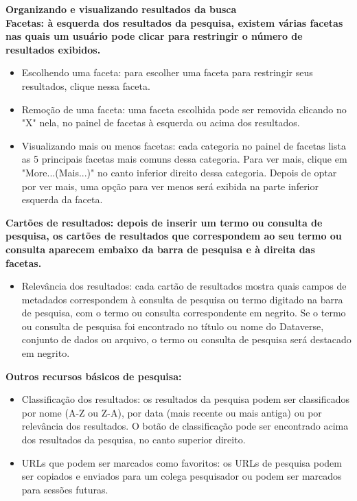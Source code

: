 \documentclass[12pt,hidelinks]{article}
\begin{document}
	    
 \textbf{Organizando e visualizando resultados da busca}\\
	        
	        
\textbf {Facetas: à esquerda dos resultados da pesquisa, existem várias facetas nas quais um usuário pode clicar para restringir o número de resultados exibidos.}

\begin{itemize}
\item Escolhendo uma faceta: para escolher uma faceta para restringir seus resultados, clique nessa faceta.
\item Remoção de uma faceta: uma faceta escolhida pode ser removida clicando no "X" nela, no painel de facetas à esquerda ou acima dos resultados.
\item Visualizando mais ou menos facetas: cada categoria no painel de facetas lista as 5 principais facetas mais comuns dessa categoria. Para ver mais, clique em "More...(Mais...)" no canto inferior direito dessa categoria. Depois de optar por ver mais, uma opção para ver menos será exibida na parte inferior esquerda da faceta.
\end{itemize}

\textbf{Cartões de resultados: depois de inserir um termo ou consulta de pesquisa, os cartões de resultados que correspondem ao seu termo ou consulta aparecem embaixo da barra de pesquisa e à direita das facetas.}

\begin{itemize}
\item Relevância dos resultados: cada cartão de resultados mostra quais campos de metadados correspondem à consulta de pesquisa ou termo digitado na barra de pesquisa, com o termo ou consulta correspondente em negrito. Se o termo ou consulta de pesquisa foi encontrado no título ou nome do Dataverse, conjunto de dados ou arquivo, o termo ou consulta de pesquisa será destacado em negrito.
\end{itemize}

\textbf{Outros recursos básicos de pesquisa:}

\begin{itemize}
\item Classificação dos resultados: os resultados da pesquisa podem ser classificados por nome (A-Z ou Z-A), por data (mais recente ou mais antiga) ou por relevância dos resultados. O botão de classificação pode ser encontrado acima dos resultados da pesquisa, no canto superior direito.
\item URLs que podem ser marcados como favoritos: os URLs de pesquisa podem ser copiados e enviados para um colega pesquisador ou podem ser marcados para sessões futuras.
\end{itemize}
	        
\end{document}
